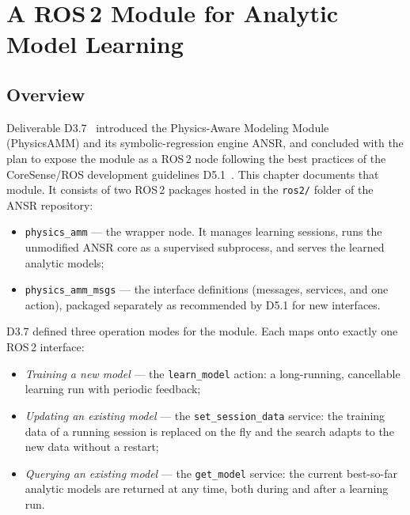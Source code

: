%   

\chapter{A ROS\,2 Module for Analytic Model Learning}
\label{ros2:chapter}

\section{Overview}
\label{ros2:sec:overview}

Deliverable D3.7~\cite{ros2:d37} introduced the Physics-Aware Modeling Module
(PhysicsAMM) and its symbolic-regression engine ANSR, and concluded with the
plan to expose the module as a ROS\,2 node following the best practices of the
CoreSense/ROS development guidelines D5.1~\cite{ros2:d51}. This chapter
documents that module. It consists of two ROS\,2 packages hosted in the
\texttt{ros2/} folder of the ANSR repository:

\begin{itemize}
  \item \texttt{physics\_amm} --- the wrapper node. It manages learning
        sessions, runs the unmodified ANSR core as a supervised subprocess,
        and serves the learned analytic models;
  \item \texttt{physics\_amm\_msgs} --- the interface definitions (messages,
        services, and one action), packaged separately as recommended by
        D5.1 for new interfaces.
\end{itemize}

D3.7 defined three operation modes for the module. Each maps onto exactly one
ROS\,2 interface:

\begin{itemize}
  \item \emph{Training a new model} --- the \texttt{learn\_model} action:
        a long-running, cancellable learning run with periodic feedback;
  \item \emph{Updating an existing model} --- the \texttt{set\_session\_data}
        service: the training data of a running session is replaced on the
        fly and the search adapts to the new data without a restart;
  \item \emph{Querying an existing model} --- the \texttt{get\_model}
        service: the current best-so-far analytic models are returned at any
        time, both during and after a learning run.
\end{itemize}

